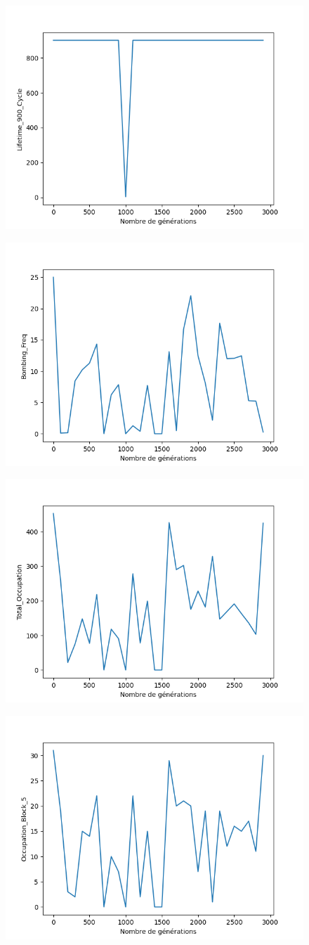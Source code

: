 \documentclass[a4paper,12pt]{article} %
\begin{document}
\begin{figure}[!ht]
\centering
\begin{minipage}{.5\textwidth}
  \centering
  \includegraphics[width=.5\linewidth]{images/Lifetime_900_Cycle.png}
  \label{fig:test1}
\end{minipage}
\begin{minipage}{.5\textwidth}
  \centering
  \includegraphics[width=.5\linewidth]{images/Bombing_Freq.png}
  \label{fig:test2}
\end{minipage}
\begin{minipage}{.5\textwidth}
  \centering
  \includegraphics[width=.5\linewidth]{images/Total_Occupation.png}
  \label{fig:test3}
\end{minipage}
\begin{minipage}{.5\textwidth}
  \centering
  \includegraphics[width=.5\linewidth]{images/Occupation_Block_5.png}

\end{minipage}
\end{figure}
\end{document}
